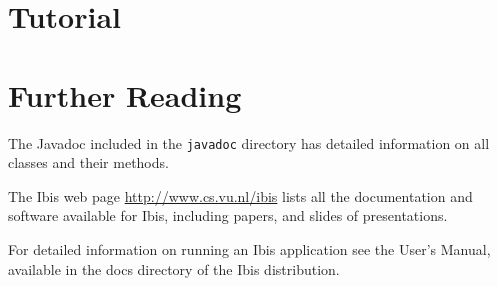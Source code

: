 \documentclass[10pt]{article}
\begin{document}
\section{Tutorial}



\section{Further Reading}

The Javadoc included in the \texttt{javadoc} directory has detailed
information on all classes and their methods.

The Ibis web page \url{http://www.cs.vu.nl/ibis} lists all
the documentation and software available for Ibis, including papers, and
slides of presentations.

For detailed information on running an Ibis application see the
User's Manual, available in the docs directory of the Ibis
distribution.
\end{document}
